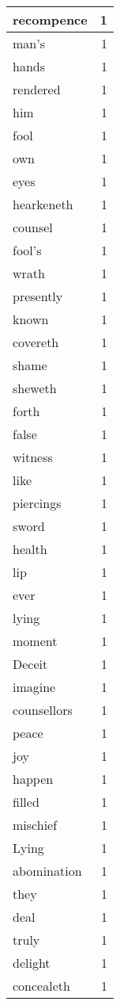 \begin{center}
\begin{longtable}{l|r}
recompence & 1\\ \hline 
man's & 1\\ \hline 
hands & 1\\ \hline 
rendered & 1\\ \hline 
him & 1\\ \hline 
fool & 1\\ \hline 
own & 1\\ \hline 
eyes & 1\\ \hline 
hearkeneth & 1\\ \hline 
counsel & 1\\ \hline 
fool's & 1\\ \hline 
wrath & 1\\ \hline 
presently & 1\\ \hline 
known & 1\\ \hline 
covereth & 1\\ \hline 
shame & 1\\ \hline 
sheweth & 1\\ \hline 
forth & 1\\ \hline 
false & 1\\ \hline 
witness & 1\\ \hline 
like & 1\\ \hline 
piercings & 1\\ \hline 
sword & 1\\ \hline 
health & 1\\ \hline 
lip & 1\\ \hline 
ever & 1\\ \hline 
lying & 1\\ \hline 
moment & 1\\ \hline 
Deceit & 1\\ \hline 
imagine & 1\\ \hline 
counsellors & 1\\ \hline 
peace & 1\\ \hline 
joy & 1\\ \hline 
happen & 1\\ \hline 
filled & 1\\ \hline 
mischief & 1\\ \hline 
Lying & 1\\ \hline 
abomination & 1\\ \hline 
they & 1\\ \hline 
deal & 1\\ \hline 
truly & 1\\ \hline 
delight & 1\\ \hline 
concealeth & 1\\ \hline 

\end{longtable}
\end{center}
